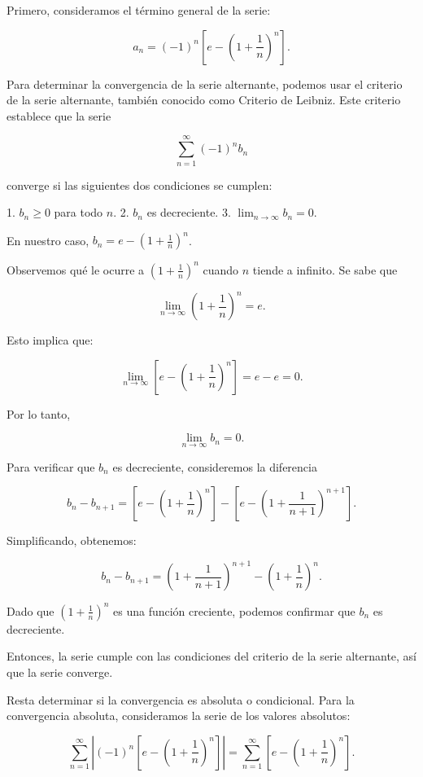 \documentclass{article}
\begin{document}
    Primero, consideramos el término general de la serie:

    $$a_n = (-1)^n \left[e - \left(1 + \frac{1}{n}\right)^n \right].$$

    Para determinar la convergencia de la serie alternante, podemos usar el criterio de la serie alternante, también conocido como Criterio de Leibniz. Este criterio establece que la serie

    $$\sum_{n=1}^{\infty} (-1)^n b_n$$

    converge si las siguientes dos condiciones se cumplen:

    1. \(b_n \geq 0\) para todo \(n\).
    2. \(b_n\) es decreciente.
    3. \(\lim_{n \to \infty} b_n = 0\).

    En nuestro caso, \(b_n = e - \left(1 + \frac{1}{n}\right)^n\).

    Observemos qué le ocurre a \( \left(1 + \frac{1}{n}\right)^n \) cuando \(n\) tiende a infinito. Se sabe que

    $$
    \lim_{n \to \infty} \left(1 + \frac{1}{n}\right)^n = e.
    $$

    Esto implica que:

    $$
    \lim_{n \to \infty} \left[e - \left(1 + \frac{1}{n}\right)^n\right] = e - e = 0.
    $$

    Por lo tanto,

    $$\lim_{n \to \infty} b_n = 0.$$

    Para verificar que \(b_n\) es decreciente, consideremos la diferencia

    $$b_n - b_{n+1} = \left[e - \left(1 + \frac{1}{n}\right)^n \right] - \left[e - \left(1 + \frac{1}{n+1}\right)^{n+1} \right].$$

    Simplificando, obtenemos:

    $$
    b_n - b_{n+1} = \left(1 + \frac{1}{n+1}\right)^{n+1} - \left(1 + \frac{1}{n}\right)^n.
    $$

    Dado que \( \left(1 + \frac{1}{n}\right)^n \) es una función creciente, podemos confirmar que \(b_n\) es decreciente.

    Entonces, la serie cumple con las condiciones del criterio de la serie alternante, así que la serie converge.

    Resta determinar si la convergencia es absoluta o condicional. Para la convergencia absoluta, consideramos la serie de los valores absolutos:

    $$
    \sum_{n=1}^{\infty} \left|(-1)^n \left[e - \left(1 + \frac{1}{n}\right)^n \right]\right| = \sum_{n=1}^{\infty} \left[e - \left(1 + \frac{1}{n}\right)^n \right].
    $$
\end{document}
